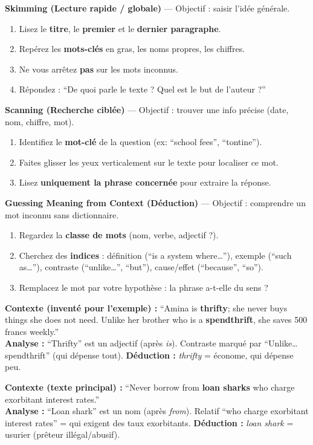 \documentclass[11pt]{article}
\begin{document}
\begin{methode}
\textbf{Skimming (Lecture rapide / globale)} — Objectif : saisir l'idée générale.
\begin{enumerate}
\item Lisez le \textbf{titre}, le \textbf{premier} et le \textbf{dernier paragraphe}.
\item Repérez les \textbf{mots-clés} en gras, les noms propres, les chiffres.
\item Ne vous arrêtez \textbf{pas} sur les mots inconnus.
\item Répondez : “De quoi parle le texte ? Quel est le but de l'auteur ?”
\end{enumerate}

\textbf{Scanning (Recherche ciblée)} — Objectif : trouver une info précise (date, nom, chiffre, mot).
\begin{enumerate}
\item Identifiez le \textbf{mot-clé} de la question (ex: “school fees”, “tontine”).
\item Faites glisser les yeux verticalement sur le texte pour localiser ce mot.
\item Lisez \textbf{uniquement la phrase concernée} pour extraire la réponse.
\end{enumerate}

\textbf{Guessing Meaning from Context (Déduction)} — Objectif : comprendre un mot inconnu sans dictionnaire.
\begin{enumerate}
\item Regardez la \textbf{classe de mots} (nom, verbe, adjectif ?).
\item Cherchez des \textbf{indices} : définition (“is a system where…”), exemple (“such as…”), contraste (“unlike…”, “but”), cause/effet (“because”, “so”).
\item Remplacez le mot par votre hypothèse : la phrase a-t-elle du sens ?
\end{enumerate}
\end{methode}

\begin{exemplebox}
\textbf{Contexte (inventé pour l'exemple) :} “Amina is \textbf{thrifty}; she never buys things she does not need. Unlike her brother who is a \textbf{spendthrift}, she saves 500 francs weekly.” \\
\textbf{Analyse :} “Thrifty” est un adjectif (après \textit{is}). Contraste marqué par “Unlike… spendthrift” (qui dépense tout). \textbf{Déduction :} \textit{thrifty} = économe, qui dépense peu.

\textbf{Contexte (texte principal) :} “Never borrow from \textbf{loan sharks} who charge exorbitant interest rates.” \\
\textbf{Analyse :} “Loan shark” est un nom (après \textit{from}). Relatif “who charge exorbitant interest rates” = qui exigent des taux exorbitants. \textbf{Déduction :} \textit{loan shark} = usurier (prêteur illégal/abusif).
\end{exemplebox}
\end{document}
